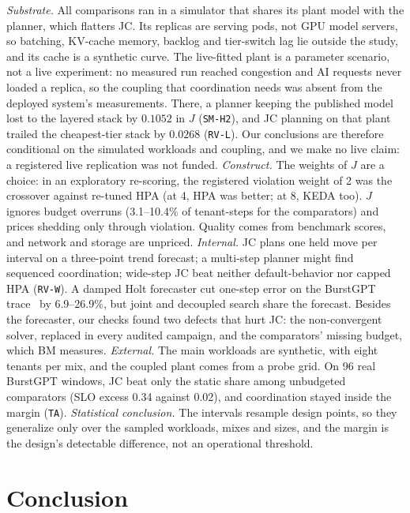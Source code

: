 \documentclass[conference,a4paper]{IEEEtran}
\newcommand{\jcac}{JC}
\newcommand{\jcac}{JCAC}
\newcommand{\rec}[1]{\texttt{\small #1}}
\begin{document}
\textit{Substrate.} All comparisons ran in a simulator that shares its plant
model with the planner, which flatters \jcac{}. Its replicas are serving
pods, not GPU model servers, so batching, KV-cache memory, backlog and
tier-switch lag lie outside the study, and its cache is a synthetic curve.
The live-fitted plant is a parameter scenario, not a live experiment: no
measured run reached congestion and AI requests never loaded a replica, so
the coupling that coordination needs was absent from the deployed system's
measurements. There, a planner keeping the published model lost to the
layered stack by $0.1052$ in $J$ (\rec{SM-H2}), and \jcac{} planning on that
plant trailed the cheapest-tier stack by $0.0268$ (\rec{RV-L}). Our conclusions are
therefore conditional on the simulated workloads and coupling, and we make
no live claim: a registered live replication was not funded.
\textit{Construct.} The weights of
$J$ are a choice: in an exploratory re-scoring, the registered violation
weight of 2 was the crossover against re-tuned HPA (at 4, HPA was better;
at 8, KEDA too). $J$ ignores budget overruns (3.1--10.4\% of
tenant-steps for the comparators) and prices shedding only through
violation. Quality comes from benchmark scores, and network and storage are
unpriced. \textit{Internal.} \jcac{} plans one held move per interval on a
three-point trend forecast; a multi-step planner might find sequenced
coordination; wide-step \jcac{} beat neither default-behavior nor capped
HPA (\rec{RV-W}).
A damped Holt forecaster cut one-step error on the BurstGPT
trace~\cite{burstgpt} by 6.9--26.9\%, but joint and decoupled search share
the forecast. Besides the forecaster, our
checks found two defects that hurt \jcac{}: the non-convergent solver,
replaced in every audited campaign, and the comparators' missing budget,
which BM measures. \textit{External.} The main
workloads are synthetic, with eight tenants per mix, and the coupled plant
comes from a probe grid. On 96 real BurstGPT windows, \jcac{} beat only the
static share among unbudgeted comparators (SLO excess 0.34 against 0.02),
and coordination stayed inside the margin (\rec{TA}).
\textit{Statistical conclusion.} The intervals resample design points, so
they generalize only over the sampled workloads, mixes and sizes, and the
margin is the design's detectable difference, not an operational threshold.

\section{Conclusion}
\label{sec:conclusion}
\end{document}
